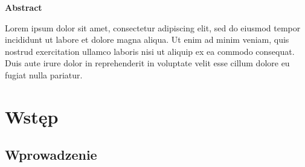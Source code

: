 \documentclass[a4paper,12pt,reqno]{article}
\begin{document}
\newpage
\begin{flushleft}
\Large \textbf{Abstract}
\end{flushleft}
\vspace{1cm}


Lorem ipsum dolor sit amet, consectetur adipiscing elit, sed do eiusmod tempor incididunt ut labore et dolore magna aliqua. Ut enim ad minim veniam, quis nostrud exercitation ullamco laboris nisi ut aliquip ex ea commodo consequat. Duis aute irure dolor in reprehenderit in voluptate velit esse cillum dolore eu fugiat nulla pariatur.

\newpage

\section{Wstęp}

\subsection{Wprowadzenie}
\end{document}
